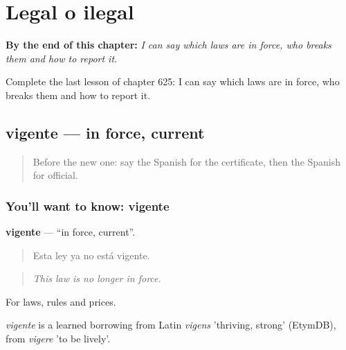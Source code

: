 
\chapter{Legal o ilegal}
\label{ch:es-legal-o-ilegal}

\begin{chapteropening}
\textbf{By the end of this chapter:} \emph{I can say which laws are in force, who breaks them and how to report it.}

Complete the last lesson of chapter 625: I can say which laws are in force, who breaks them and how to report it.
\end{chapteropening}

\section[vigente]{vigente — in force, current}

\label{lesson:ES-C625-vigente}



\begin{quote}
Before the new one: say the Spanish for the certificate, then the Spanish for official.
\end{quote}

\subsection*{You'll want to know: vigente}
\textbf{vigente} — \textquotedblleft{}in force, current\textquotedblright{}.

\begin{quote}
Esta ley ya no está vigente.
\end{quote}

\begin{quote}
\emph{This law is no longer in force.}
\end{quote}

For laws, rules and prices.

\begin{cousinweb}
\emph{vigente} is a learned borrowing from Latin \emph{vigens} 'thriving, strong' (EtymDB), from \emph{vigere} 'to be lively'.
\end{cousinweb}

